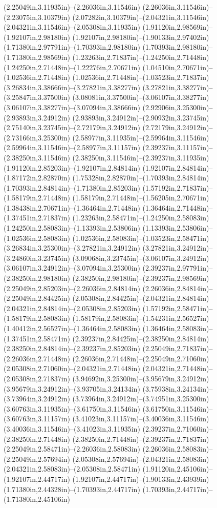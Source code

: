 (2.25049in,3.11935in)--(2.26036in,3.11546in) (2.26036in,3.11546in)--(2.23075in,3.10379in) (2.07282in,3.10379in)--(2.04321in,3.11546in) (2.04321in,3.11546in)--(2.05308in,3.11935in) (1.91120in,2.98569in)--(1.92107in,2.98180in) (1.92107in,2.98180in)--(1.90133in,2.97402in) (1.71380in,2.97791in)--(1.70393in,2.98180in) (1.70393in,2.98180in)--(1.71380in,2.98569in) (1.23263in,2.71837in)--(1.24250in,2.71448in) (1.24250in,2.71448in)--(1.22276in,2.70671in) (1.04510in,2.70671in)--(1.02536in,2.71448in) (1.02536in,2.71448in)--(1.03523in,2.71837in) (3.26834in,3.38666in)--(3.27821in,3.38277in) (3.27821in,3.38277in)--(3.25847in,3.37500in) (3.08081in,3.37500in)--(3.06107in,3.38277in) (3.06107in,3.38277in)--(3.07094in,3.38666in) (2.92906in,3.25300in)--(2.93893in,3.24912in) (2.93893in,3.24912in)--(2.90932in,3.23745in) (2.75140in,3.23745in)--(2.72179in,3.24912in) (2.72179in,3.24912in)--(2.73166in,3.25300in) (2.58977in,3.11935in)--(2.59964in,3.11546in) (2.59964in,3.11546in)--(2.58977in,3.11157in) (2.39237in,3.11157in)--(2.38250in,3.11546in) (2.38250in,3.11546in)--(2.39237in,3.11935in) (1.91120in,2.85203in)--(1.92107in,2.84814in) (1.92107in,2.84814in)--(1.87172in,2.82870in) (1.75328in,2.82870in)--(1.70393in,2.84814in) (1.70393in,2.84814in)--(1.71380in,2.85203in) (1.57192in,2.71837in)--(1.58179in,2.71448in) (1.58179in,2.71448in)--(1.56205in,2.70671in) (1.38438in,2.70671in)--(1.36464in,2.71448in) (1.36464in,2.71448in)--(1.37451in,2.71837in) (1.23263in,2.58471in)--(1.24250in,2.58083in) (1.24250in,2.58083in)--(1.13393in,2.53806in) (1.13393in,2.53806in)--(1.02536in,2.58083in) (1.02536in,2.58083in)--(1.03523in,2.58471in) (3.26834in,3.25300in)--(3.27821in,3.24912in) (3.27821in,3.24912in)--(3.24860in,3.23745in) (3.09068in,3.23745in)--(3.06107in,3.24912in) (3.06107in,3.24912in)--(3.07094in,3.25300in) (2.39237in,2.97791in)--(2.38250in,2.98180in) (2.38250in,2.98180in)--(2.39237in,2.98569in) (2.25049in,2.85203in)--(2.26036in,2.84814in) (2.26036in,2.84814in)--(2.25049in,2.84425in) (2.05308in,2.84425in)--(2.04321in,2.84814in) (2.04321in,2.84814in)--(2.05308in,2.85203in) (1.57192in,2.58471in)--(1.58179in,2.58083in) (1.58179in,2.58083in)--(1.54231in,2.56527in) (1.40412in,2.56527in)--(1.36464in,2.58083in) (1.36464in,2.58083in)--(1.37451in,2.58471in) (2.39237in,2.84425in)--(2.38250in,2.84814in) (2.38250in,2.84814in)--(2.39237in,2.85203in) (2.25049in,2.71837in)--(2.26036in,2.71448in) (2.26036in,2.71448in)--(2.25049in,2.71060in) (2.05308in,2.71060in)--(2.04321in,2.71448in) (2.04321in,2.71448in)--(2.05308in,2.71837in) (3.94692in,3.25300in)--(3.95679in,3.24912in) (3.95679in,3.24912in)--(3.93705in,3.24134in) (3.75938in,3.24134in)--(3.73964in,3.24912in) (3.73964in,3.24912in)--(3.74951in,3.25300in) (3.60763in,3.11935in)--(3.61750in,3.11546in) (3.61750in,3.11546in)--(3.60763in,3.11157in) (3.41023in,3.11157in)--(3.40036in,3.11546in) (3.40036in,3.11546in)--(3.41023in,3.11935in) (2.39237in,2.71060in)--(2.38250in,2.71448in) (2.38250in,2.71448in)--(2.39237in,2.71837in) (2.25049in,2.58471in)--(2.26036in,2.58083in) (2.26036in,2.58083in)--(2.25049in,2.57694in) (2.05308in,2.57694in)--(2.04321in,2.58083in) (2.04321in,2.58083in)--(2.05308in,2.58471in) (1.91120in,2.45106in)--(1.92107in,2.44717in) (1.92107in,2.44717in)--(1.90133in,2.43939in) (1.71380in,2.44328in)--(1.70393in,2.44717in) (1.70393in,2.44717in)--(1.71380in,2.45106in) 